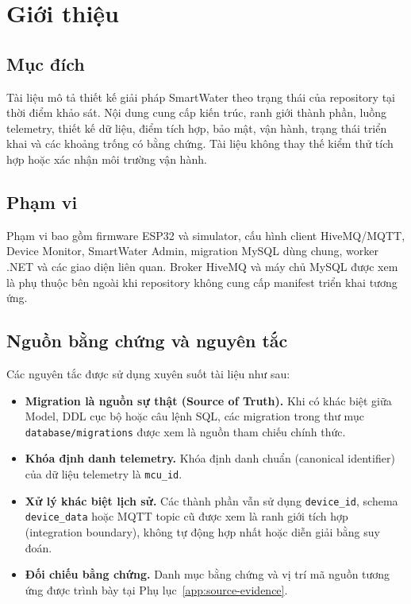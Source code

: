 \chapter{Giới thiệu}
\label{chap:introduction}

\section{Mục đích}

Tài liệu mô tả thiết kế giải pháp SmartWater theo trạng thái của repository tại thời
điểm khảo sát. Nội dung cung cấp kiến trúc, ranh giới thành phần, luồng telemetry,
thiết kế dữ liệu, điểm tích hợp, bảo mật, vận hành, trạng thái triển khai và các khoảng
trống có bằng chứng. Tài liệu không thay thế kiểm thử tích hợp hoặc xác nhận môi trường
vận hành.

\section{Phạm vi}

Phạm vi bao gồm firmware ESP32 và simulator, cấu hình client HiveMQ/MQTT, Device
Monitor, SmartWater Admin, migration MySQL dùng chung, worker .NET và các giao diện
liên quan. Broker HiveMQ và máy chủ MySQL được xem là phụ thuộc bên ngoài khi repository
không cung cấp manifest triển khai tương ứng.

\section{Nguồn bằng chứng và nguyên tắc}

Các nguyên tắc được sử dụng xuyên suốt tài liệu như sau:

\begin{itemize}
    \item \textbf{Migration là nguồn sự thật (Source of Truth).}
    Khi có khác biệt giữa Model, DDL cục bộ hoặc câu lệnh SQL, các migration trong thư mục
    \texttt{database/migrations} được xem là nguồn tham chiếu chính thức.

    \item \textbf{Khóa định danh telemetry.}
    Khóa định danh chuẩn (canonical identifier) của dữ liệu telemetry là
    \texttt{mcu\_id}.

    \item \textbf{Xử lý khác biệt lịch sử.}
    Các thành phần vẫn sử dụng \texttt{device\_id}, schema
    \texttt{device\_data} hoặc MQTT topic cũ được xem là ranh giới tích hợp
    (integration boundary), không tự động hợp nhất hoặc diễn giải bằng suy đoán.

    \item \textbf{Đối chiếu bằng chứng.}
    Danh mục bằng chứng và vị trí mã nguồn tương ứng được trình bày tại
    Phụ lục~\ref{app:source-evidence}.
\end{itemize}
